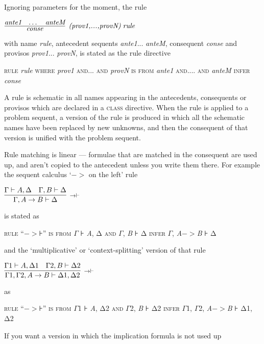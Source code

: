 Ignoring parameters for the moment, the rule

$\infer[\textit{(prov1,...,provN)\;rule}]
       {\textit{conse}}
       {\textit{ante1} & \dots & \textit{anteM}}$

with name \textit{rule}, antecedent sequents \textit{ante1}... \textit{anteM}, consequent \textit{conse} and provisos \textit{prov1}... \textit{provN}, is stated as the rule directive

\textsc{rule} \textit{rule} \textsc{where} \textit{prov1} \textsc{and... and} \textit{provN} \textsc{is from} \textit{ante1} \textsc{and.... and} \textit{anteM} \textsc{infer} \textit{conse}

A rule is schematic in all names appearing in the antecedents, consequents or provisos which are declared in a \textsc{class} directive. When the rule is applied to a problem sequent, a version of the rule is produced in which all the schematic names have been replaced by new unknowns, and then the consequent of that version is unified with the problem sequent.

Rule matching is linear --- formulae that are matched in the consequent are used up, and aren't copied to the antecedent unless you write them there. For example the sequent calculus `$->$ on the left' rule


$\infer[\reason{$->|- $}]
       {\Gamma,A->B |- \Delta }
       {\Gamma  |- A,\Delta \quad \Gamma,B |- \Delta }$

is stated as


\textsc{rule} ``$->$⊦'' \textsc{is from} \textsc{\ensuremath{\Gamma}} \textsc{⊦} \textit{A}, Δ \textsc{and} \textsc{\ensuremath{\Gamma}}\textsc{,} \textit{B} ⊦ Δ \textsc{infer} \textsc{\ensuremath{\Gamma}}, \textit{A}$->$\textit{B} ⊦ Δ

and the `multiplicative' or `context-splitting' version of that rule


$\infer[\reason{$->|- $}]
       {\Gamma 1,\Gamma 2,A->B |- \Delta 1,\Delta 2}
       {\Gamma 1 |- A,\Delta 1\quad \Gamma 2,B |- \Delta 2}$

as


\textsc{rule} ``$->$⊦'' \textsc{is from} \textsc{\ensuremath{\Gamma}1} \textsc{⊦} \textit{A}, Δ2 \textsc{and} \textsc{\ensuremath{\Gamma}2}\textsc{,} \textit{B} ⊦ Δ2 \textsc{infer} \textsc{\ensuremath{\Gamma}1, \ensuremath{\Gamma}2}, \textit{A}$->$\textit{B} ⊦ Δ1, Δ2


If you want a version in which the implication formula is not used up


